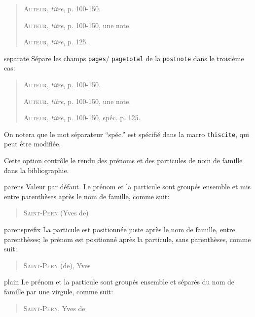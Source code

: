 \documentclass{ltxdockit}
\begin{document}
\begin{optionlist}
\begin{valuelist}
\begin{quote}
\textsc{Auteur}, \emph{titre}, p. 100-150. 

\textsc{Auteur}, \emph{titre}, p. 100-150, une note.

\textsc{Auteur}, \emph{titre}, p. 125.
\end{quote}
%
\item[separate] Sépare les champs \texttt{pages}\slash
\texttt{pagetotal} de la \texttt{postnote} dans le troisième cas:

\begin{quote}
\textsc{Auteur}, \emph{titre}, p. 100-150. 

\textsc{Auteur}, \emph{titre}, p. 100-150, une note.

\textsc{Auteur}, \emph{titre}, p. 100-150, spéc. p. 125.
\end{quote}
%
On notera que le mot séparateur \enquote{spéc.} est spécifié dans la macro \texttt{thiscite}, qui peut être modifiée.
\end{valuelist}


Cette option contrôle le rendu des prénoms et des particules de nom de famille dans la bibliographie.

\begin{valuelist}
\item[parens] Valeur par défaut. Le prénom et la particule sont groupés ensemble et mis entre parenthèses après le nom de famille, comme suit:
\begin{quote}
\textsc{Saint-Pern} (Yves de) 
\end{quote}

\item[parensprefix] La particule est positionnée juste après le nom de famille, entre parenthèses; le prénom est positionné après la particule, sans parenthèses, comme suit:
\begin{quote}
\textsc{Saint-Pern} (de), Yves 
\end{quote}

\item[plain] Le prénom et la particule sont groupés ensemble et séparés du nom de famille par une virgule, comme suit:
\begin{quote}
\textsc{Saint-Pern}, Yves de 
\end{quote}
\end{valuelist}



\end{optionlist}
\end{document}

